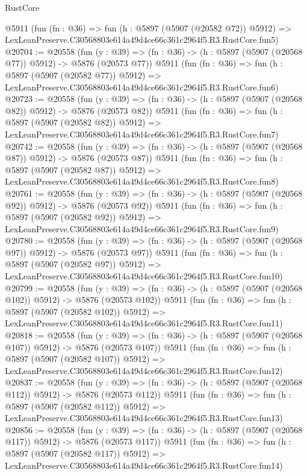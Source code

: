 \begin{lexlean}{RustCore}
\begin{coremodule}
    @5911
    (fun (fn : @36) =>
    fun (h : @5897 (@5907 (@20582 @72)) @5912) =>
    LexLeanPreserve.C30568803e614a49d4ce66c361c2964f5.R3.RustCore.fun5)
@20704 := @20558
    (fun (y : @39) => (fn : @36) -> (h : @5897 (@5907 (@20568 @77)) @5912) -> @5876 (@20573 @77))
    @5911
    (fun (fn : @36) =>
    fun (h : @5897 (@5907 (@20582 @77)) @5912) =>
    LexLeanPreserve.C30568803e614a49d4ce66c361c2964f5.R3.RustCore.fun6)
@20723 := @20558
    (fun (y : @39) => (fn : @36) -> (h : @5897 (@5907 (@20568 @82)) @5912) -> @5876 (@20573 @82))
    @5911
    (fun (fn : @36) =>
    fun (h : @5897 (@5907 (@20582 @82)) @5912) =>
    LexLeanPreserve.C30568803e614a49d4ce66c361c2964f5.R3.RustCore.fun7)
@20742 := @20558
    (fun (y : @39) => (fn : @36) -> (h : @5897 (@5907 (@20568 @87)) @5912) -> @5876 (@20573 @87))
    @5911
    (fun (fn : @36) =>
    fun (h : @5897 (@5907 (@20582 @87)) @5912) =>
    LexLeanPreserve.C30568803e614a49d4ce66c361c2964f5.R3.RustCore.fun8)
@20761 := @20558
    (fun (y : @39) => (fn : @36) -> (h : @5897 (@5907 (@20568 @92)) @5912) -> @5876 (@20573 @92))
    @5911
    (fun (fn : @36) =>
    fun (h : @5897 (@5907 (@20582 @92)) @5912) =>
    LexLeanPreserve.C30568803e614a49d4ce66c361c2964f5.R3.RustCore.fun9)
@20780 := @20558
    (fun (y : @39) => (fn : @36) -> (h : @5897 (@5907 (@20568 @97)) @5912) -> @5876 (@20573 @97))
    @5911
    (fun (fn : @36) =>
    fun (h : @5897 (@5907 (@20582 @97)) @5912) =>
    LexLeanPreserve.C30568803e614a49d4ce66c361c2964f5.R3.RustCore.fun10)
@20799 := @20558
    (fun (y : @39) => (fn : @36) -> (h : @5897 (@5907 (@20568 @102)) @5912) -> @5876 (@20573 @102))
    @5911
    (fun (fn : @36) =>
    fun (h : @5897 (@5907 (@20582 @102)) @5912) =>
    LexLeanPreserve.C30568803e614a49d4ce66c361c2964f5.R3.RustCore.fun11)
@20818 := @20558
    (fun (y : @39) => (fn : @36) -> (h : @5897 (@5907 (@20568 @107)) @5912) -> @5876 (@20573 @107))
    @5911
    (fun (fn : @36) =>
    fun (h : @5897 (@5907 (@20582 @107)) @5912) =>
    LexLeanPreserve.C30568803e614a49d4ce66c361c2964f5.R3.RustCore.fun12)
@20837 := @20558
    (fun (y : @39) => (fn : @36) -> (h : @5897 (@5907 (@20568 @112)) @5912) -> @5876 (@20573 @112))
    @5911
    (fun (fn : @36) =>
    fun (h : @5897 (@5907 (@20582 @112)) @5912) =>
    LexLeanPreserve.C30568803e614a49d4ce66c361c2964f5.R3.RustCore.fun13)
@20856 := @20558
    (fun (y : @39) => (fn : @36) -> (h : @5897 (@5907 (@20568 @117)) @5912) -> @5876 (@20573 @117))
    @5911
    (fun (fn : @36) =>
    fun (h : @5897 (@5907 (@20582 @117)) @5912) =>
    LexLeanPreserve.C30568803e614a49d4ce66c361c2964f5.R3.RustCore.fun14)

\end{coremodule}
\end{lexlean}
